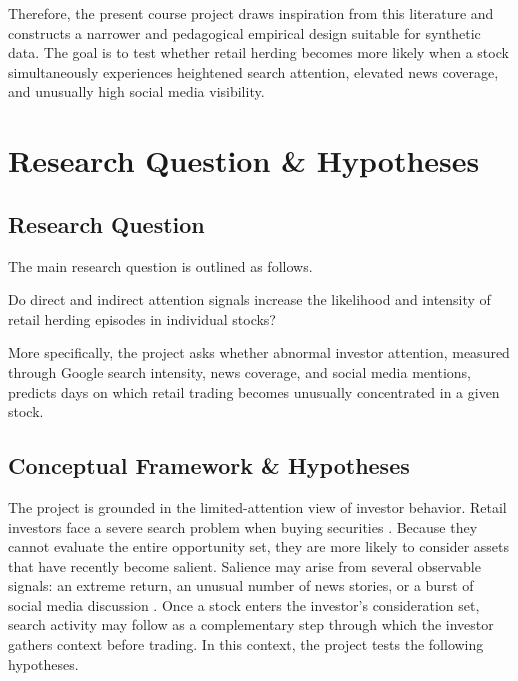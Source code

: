 \documentclass[12pt]{article}
\begin{document}
Therefore, the present course project draws inspiration from this literature and constructs a
narrower and pedagogical empirical design suitable for synthetic data. The goal is to test
whether retail herding becomes more likely when a stock simultaneously experiences heightened
search attention, elevated news coverage, and unusually high social media visibility.

\section{Research Question \& Hypotheses}

\subsection{Research Question}

The main research question is outlined as follows.

\begin{tcolorbox}[colback=blue!5!white, colframe=blue!75!black, title=Research Question]
Do direct and indirect attention signals increase the likelihood and intensity of
retail herding episodes in individual stocks?
\end{tcolorbox}

More specifically, the project asks whether abnormal investor attention, measured through
Google search intensity, news coverage, and social media mentions, predicts days on which
retail trading becomes unusually concentrated in a given stock.

\subsection{Conceptual Framework \& Hypotheses}

The project is grounded in the limited-attention view of investor behavior.
Retail investors face a severe search problem when buying securities \parencite{BarberOdean2008}.
Because they cannot evaluate the entire opportunity set, they are more likely to
consider assets that have recently become salient. Salience may arise from several observable
signals: an extreme return, an unusual number of news stories, or a burst of social media
discussion \parencite{ArdiaEtal2023,BarberEtal2022,DeGiorgiEtal2026,deHaanEtal2024}. Once a
stock enters the investor's consideration set, search activity may follow as a complementary
step through which the investor gathers context before trading. In this context, the project tests the following hypotheses.
\end{document}
